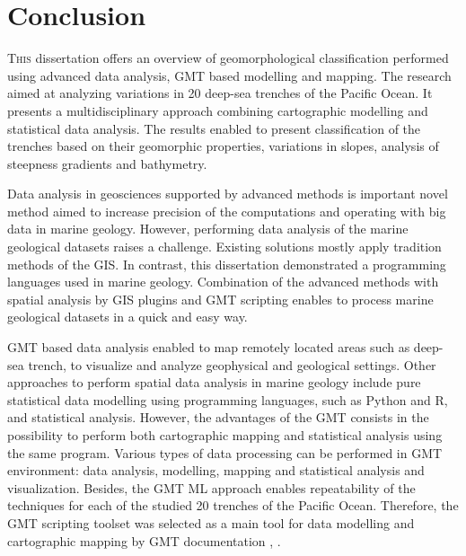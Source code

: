 \documentclass[11pt,a4paper]{report}
\begin{document}
{\vspace{1.5em}
\hspace{4em}

\pagebreak
\chapter{Conclusion}\label{chp:6}
\lettrine[lines=3]{\color{LightSteelBlue4}T}{his} dissertation offers an overview of geomorphological classification performed using advanced data analysis, \ac{GMT} based modelling and mapping. The research aimed at analyzing variations in 20 deep-sea trenches of the Pacific Ocean. It presents a multidisciplinary approach combining cartographic modelling and statistical data analysis. The results enabled to present classification of the trenches based on their geomorphic properties, variations in slopes, analysis of steepness gradients and bathymetry.

Data analysis in geosciences supported by advanced methods is important novel method aimed to increase precision of the computations and operating with big data in marine geology. However, performing data analysis of the marine geological datasets raises a challenge. Existing solutions mostly apply tradition methods of the \ac{GIS}. In contrast, this dissertation demonstrated a programming languages used in marine geology. Combination of the advanced methods with spatial analysis by \ac{GIS} plugins and \ac{GMT} scripting enables to process marine geological datasets in a quick and easy way.

\ac{GMT} based data analysis enabled to map remotely located areas such as deep-sea trench, to visualize and analyze geophysical and geological settings. Other approaches to perform spatial data analysis in marine geology include pure statistical data modelling using programming languages, such as Python and R, and statistical analysis. However, the advantages of the \ac{GMT} consists in the possibility to perform both cartographic mapping and statistical analysis using the same program. Various types of data processing can be performed in \ac{GMT} environment: data analysis, modelling, mapping and statistical analysis and visualization. Besides, the \ac{GMT} \ac{ML} approach enables repeatability of the techniques for each of the studied 20 trenches of the Pacific Ocean. Therefore, the \ac{GMT} scripting toolset was selected as a main tool for data modelling and cartographic mapping by \ac{GMT} documentation \cite{WesselSmith2018}, \cite{Wesseletal2019}.

}
\end{document}
